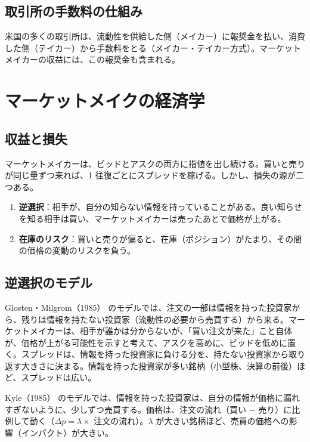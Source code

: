 \subsection{取引所の手数料の仕組み}

米国の多くの取引所は、流動性を供給した側（メイカー）に報奨金を払い、消費した側（テイカー）から手数料をとる（メイカー・テイカー方式）。マーケットメイカーの収益には、この報奨金も含まれる。

\section{マーケットメイクの経済学}

\subsection{収益と損失}

マーケットメイカーは、ビッドとアスクの両方に指値を出し続ける。買いと売りが同じ量ずつ来れば、1 往復ごとにスプレッドを稼げる。しかし、損失の源が二つある。

\begin{enumerate}
\item \textbf{逆選択}：相手が、自分の知らない情報を持っていることがある。良い知らせを知る相手は買い、マーケットメイカーは売ったあとで価格が上がる。
\item \textbf{在庫のリスク}：買いと売りが偏ると、在庫（ポジション）がたまり、その間の価格の変動のリスクを負う。
\end{enumerate}

\subsection{逆選択のモデル}

Glosten・Milgrom（1985）\cite{glostenmilgrom1985} のモデルでは、注文の一部は情報を持った投資家から、残りは情報を持たない投資家（流動性の必要から売買する）から来る。マーケットメイカーは、相手が誰かは分からないが、「買い注文が来た」こと自体が、価格が上がる可能性を示すと考えて、アスクを高めに、ビッドを低めに置く。スプレッドは、情報を持った投資家に負ける分を、持たない投資家から取り返す大きさに決まる。情報を持った投資家が多い銘柄（小型株、決算の前後）ほど、スプレッドは広い。

Kyle（1985）\cite{kyle1985} のモデルでは、情報を持った投資家は、自分の情報が価格に漏れすぎないように、少しずつ売買する。価格は、注文の流れ（買い − 売り）に比例して動く（$\Delta p = \lambda \times$ 注文の流れ）。$\lambda$ が大きい銘柄ほど、売買の価格への影響（インパクト）が大きい。

